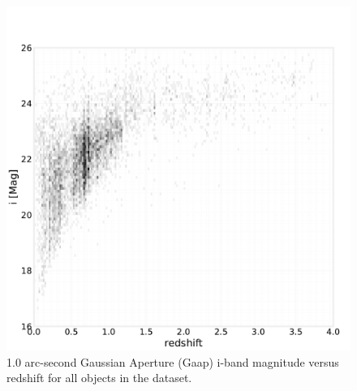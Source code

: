 \begin{figure}
    \centering
    \includegraphics[width=\linewidth]{figures/mag_i_v_redshift.pdf}
    \caption{1.0 arc-second Gaussian Aperture (Gaap) i-band magnitude versus redshift for all objects in the  dataset.}
    \label{fig:dp_mag_i_v_redshift}
\end{figure}

